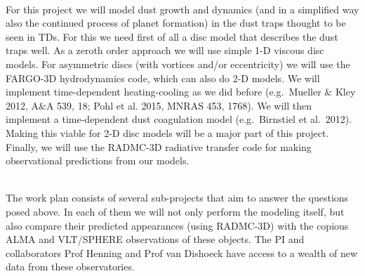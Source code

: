 \vspace{0.5em}
\\
%
For this project we will model dust growth and dynamics (and in a simplified
way also the continued process of planet formation) in the dust traps
thought to be seen in TDs. For this we need first of all a disc
model that describes the dust traps well. As a zeroth order approach we will
use simple 1-D viscous disc models. For asymmetric discs (with vortices
and/or eccentricity) we will use the FARGO-3D hydrodynamics code, which can
also do 2-D models. We will implement time-dependent heating-cooling as we
did before (e.g.~Mueller \& Kley 2012, A\&A 539, 18; Pohl et al. 2015, MNRAS
453, 1768). We will then implement a time-dependent dust coagulation model
(e.g.~Birnstiel et al.~2012). Making this viable for 2-D disc models
will be a major part of this project. Finally, we will use the RADMC-3D
radiative transfer code for making observational predictions from our
models. 


\vspace{0.5em}
\\
%
The work plan consists of several sub-projects that aim to answer the
questions posed above. In each of them we will not only perform the modeling
itself, but also compare their predicted appearances (using RADMC-3D) with
the copious ALMA and VLT/SPHERE observations of these objects. The PI
and collaborators Prof Henning and Prof 
van Dishoeck have access to a wealth of new data from these observatories.  


